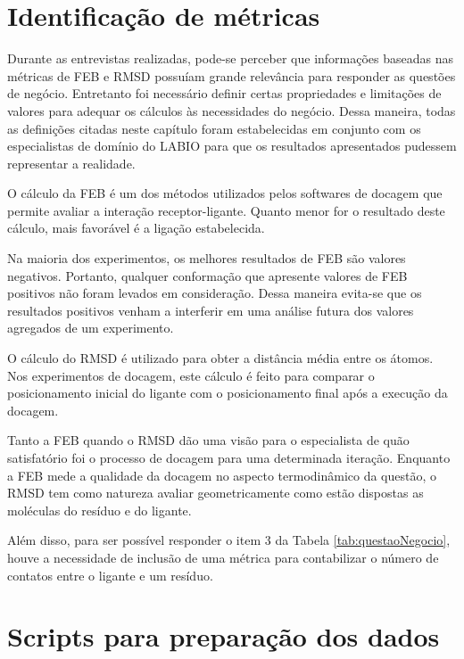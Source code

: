 \section{Identificação de métricas}

Durante as entrevistas realizadas, pode-se perceber que informações baseadas nas métricas de FEB e RMSD possuíam grande relevância para responder as questões de negócio. Entretanto foi necessário definir certas propriedades e limitações de valores para adequar os cálculos às necessidades do negócio. Dessa maneira, todas as definições citadas neste capítulo foram estabelecidas em conjunto com os especialistas de domínio do LABIO para que os resultados apresentados pudessem representar a realidade.

O cálculo da FEB é um dos métodos utilizados pelos softwares de docagem que permite avaliar a interação receptor-ligante. Quanto menor for o resultado deste cálculo, mais favorável é a ligação estabelecida. 

Na maioria dos experimentos, os melhores resultados de FEB são valores negativos. Portanto, qualquer conformação que apresente valores de FEB positivos não foram levados em consideração. Dessa maneira evita-se que os resultados positivos venham a interferir em uma análise futura dos valores agregados de um experimento. 

O cálculo do RMSD é utilizado para obter a distância média entre os átomos. Nos experimentos de docagem, este cálculo é feito para comparar o posicionamento inicial do ligante com o posicionamento final após a execução da docagem.

Tanto a FEB quando o RMSD dão uma visão para o especialista de quão satisfatório foi o processo de docagem para uma determinada iteração. Enquanto a FEB mede a qualidade da docagem no aspecto termodinâmico da questão, o RMSD tem como natureza avaliar geometricamente como estão dispostas as moléculas do resíduo e do ligante.

Além disso, para ser possível responder o item 3 da Tabela \ref{tab:questaoNegocio}, houve a necessidade de inclusão de uma métrica para contabilizar o número de contatos entre o ligante e um resíduo.


\section{Scripts para preparação dos dados}

